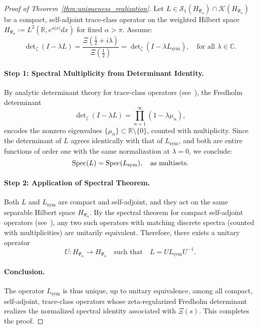 \begin{proof}[Proof of Theorem~\ref{thm:uniqueness_realization}]
Let \( L \in \mathcal{S}_1(H_{\Psi_\alpha}) \cap \mathcal{K}(H_{\Psi_\alpha}) \) be a compact, self-adjoint trace-class operator on the weighted Hilbert space \( H_{\Psi_\alpha} := L^2(\mathbb{R}, e^{\alpha|x|}dx) \) for fixed \( \alpha > \pi \). Assume:
\[
\det\nolimits_\zeta(I - \lambda L) = \frac{\Xi\left(\tfrac{1}{2} + i\lambda\right)}{\Xi\left(\tfrac{1}{2}\right)}
= \det\nolimits_\zeta(I - \lambda L_{\mathrm{sym}}),
\quad \text{for all } \lambda \in \mathbb{C}.
\]

\paragraph{Step 1: Spectral Multiplicity from Determinant Identity.}
By analytic determinant theory for trace-class operators (see~\cite[Thm. 4.2]{Simon2005TraceIdeals}), the Fredholm determinant
\[
\det\nolimits_\zeta(I - \lambda L)
= \prod_{n=1}^\infty (1 - \lambda \mu_n),
\]
encodes the nonzero eigenvalues \( \{ \mu_n \} \subset \mathbb{R} \setminus \{0\} \), counted with multiplicity. Since the determinant of \( L \) agrees identically with that of \( L_{\mathrm{sym}} \), and both are entire functions of order one with the same normalization at \( \lambda = 0 \), we conclude:
\[
\operatorname{Spec}(L) = \operatorname{Spec}(L_{\mathrm{sym}}),
\quad \text{as multisets}.
\]

\paragraph{Step 2: Application of Spectral Theorem.}
Both \( L \) and \( L_{\mathrm{sym}} \) are compact and self-adjoint, and they act on the same separable Hilbert space \( H_{\Psi_\alpha} \). By the spectral theorem for compact self-adjoint operators (see~\cite[Thm. VI.16]{ReedSimon1980I}), any two such operators with matching discrete spectra (counted with multiplicities) are unitarily equivalent. Therefore, there exists a unitary operator
\[
U \colon H_{\Psi_\alpha} \to H_{\Psi_\alpha}
\quad \text{such that} \quad
L = U L_{\mathrm{sym}} U^{-1}.
\]

\paragraph{Conclusion.}
The operator \( L_{\mathrm{sym}} \) is thus unique, up to unitary equivalence, among all compact, self-adjoint, trace-class operators whose zeta-regularized Fredholm determinant realizes the normalized spectral identity associated with \( \Xi(s) \). This completes the proof.
\end{proof}
%  